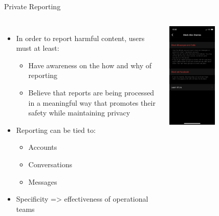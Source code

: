 \documentclass[nobackground,dvipsnames,table]{beamer}
\begin{document}
\begin{frame}{Private Reporting}
    \begin{columns}
            \begin{itemize}
                \item In order to report harmful content, users must at least: 
                \begin{itemize}
                    \item Have awareness on the how and why of reporting
                    \item Believe that reports are being processed in a meaningful way that promotes their safety while maintaining privacy
                \end{itemize}
                \item Reporting can be tied to: 
                \begin{itemize}
                    \item Accounts
                    \item Conversations
                    \item Messages
                \end{itemize}
                \item Specificity => effectiveness of operational teams
            \end{itemize}
            \includegraphics[width=0.49\textwidth]{block-alex-stamos-2}

\end{columns}
\end{frame}
\end{document}
